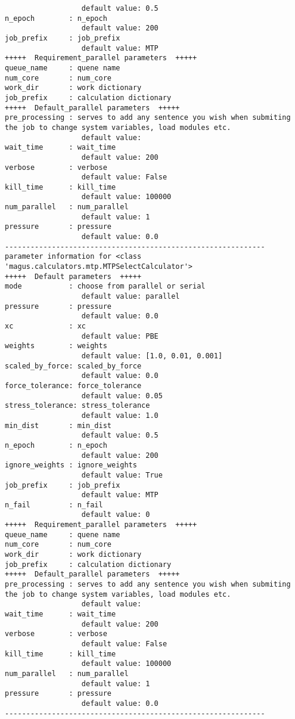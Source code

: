 \documentclass[12pt,oneside]{book}
\begin{document}
\begin{tcolorbox}
\begin{verbatim}
                  default value: 0.5
n_epoch        : n_epoch
                  default value: 200
job_prefix     : job_prefix
                  default value: MTP
+++++  Requirement_parallel parameters  +++++
queue_name     : quene name
num_core       : num_core
work_dir       : work dictionary
job_prefix     : calculation dictionary
+++++  Default_parallel parameters  +++++
pre_processing : serves to add any sentence you wish when submiting the job to change system variables, load modules etc.
                  default value: 
wait_time      : wait_time
                  default value: 200
verbose        : verbose
                  default value: False
kill_time      : kill_time
                  default value: 100000
num_parallel   : num_parallel
                  default value: 1
pressure       : pressure
                  default value: 0.0
-------------------------------------------------------------
parameter information for <class 'magus.calculators.mtp.MTPSelectCalculator'>
+++++  Default parameters  +++++
mode           : choose from parallel or serial
                  default value: parallel
pressure       : pressure
                  default value: 0.0
xc             : xc
                  default value: PBE
weights        : weights
                  default value: [1.0, 0.01, 0.001]
scaled_by_force: scaled_by_force
                  default value: 0.0
force_tolerance: force_tolerance
                  default value: 0.05
stress_tolerance: stress_tolerance
                  default value: 1.0
min_dist       : min_dist
                  default value: 0.5
n_epoch        : n_epoch
                  default value: 200
ignore_weights : ignore_weights
                  default value: True
job_prefix     : job_prefix
                  default value: MTP
n_fail         : n_fail
                  default value: 0
+++++  Requirement_parallel parameters  +++++
queue_name     : quene name
num_core       : num_core
work_dir       : work dictionary
job_prefix     : calculation dictionary
+++++  Default_parallel parameters  +++++
pre_processing : serves to add any sentence you wish when submiting the job to change system variables, load modules etc.
                  default value: 
wait_time      : wait_time
                  default value: 200
verbose        : verbose
                  default value: False
kill_time      : kill_time
                  default value: 100000
num_parallel   : num_parallel
                  default value: 1
pressure       : pressure
                  default value: 0.0
-------------------------------------------------------------

\end{verbatim}
\end{tcolorbox}
\end{document}
